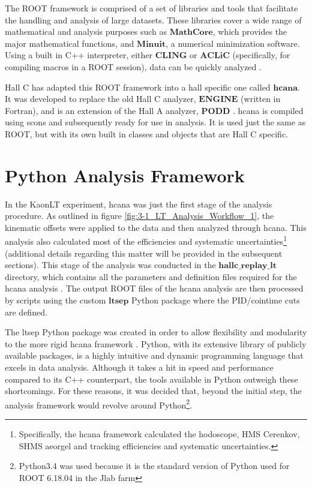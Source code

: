 \documentclass[
]{report}
\begin{document}
The ROOT framework is comprised of a set of libraries and tools that
facilitate the handling and analysis of large datasets. These libraries
cover a wide range of mathematical and analysis purposes such as
\(\textbf{MathCore}\), which provides the major mathematical functions,
and \(\textbf{Minuit}\), a numerical minimization software. Using a
built in C++ interpreter, either \(\textbf{CLING}\) or
\(\textbf{ACLiC}\) (specifically, for compiling macros in a ROOT
session), data can be quickly analyzed \cite{root_team_root_2023}.

Hall C has adapted this ROOT framework into a hall specific one called
\(\textbf{hcana}\). It was developed to replace the old Hall C analyzer,
\(\textbf{ENGINE}\) (written in Fortran), and is an extension of the
Hall A analyzer, \(\textbf{PODD}\) \cite{jones_hall_2022}
\cite{brash_github_2014}. hcana is compiled using scons and subsequently
ready for use in analysis. It is used just the same as ROOT, but with
its own built in classes and objects that are Hall C specific.

\hypertarget{Section-5.1}{%
\section{Python Analysis Framework}\label{Section-5.1}}

In the KaonLT experiment, hcana was just the first stage of the analysis
procedure. As outlined in figure \ref{fig:3-1_LT_Analysis_Workflow_1},
the kinematic offsets were applied to the data and then analyzed through
hcana. This analysis also calculated most of the efficiencies and
systematic
uncertainties\footnote{Specifically, the hcana framework calculated the hodoscope, HMS Cerenkov, SHMS aeorgel and tracking efficiencies and systematic uncertainties.}
(additional details regarding this matter will be provided in the
subsequent sections). This stage of the analysis was conducted in the
\(\textbf{hallc\_replay\_lt}\) directory, which contains all the
parameters and definition files required for the hcana analysis
\cite{kay_github_2018-1}. The output ROOT files of the hcana analysis
are then processed by scripts using the custom \(\textbf{ltsep}\) Python
package where the PID/cointime cuts are defined.



The ltsep Python package was created in order to allow flexibility and
modularity to the more rigid hcana framework \cite{trotta_github_2020}.
Python, with its extensive library of publicly available packages, is a
highly intuitive and dynamic programming language that excels in data
analysis. Although it takes a hit in speed and performance compared to
its C++ counterpart, the tools available in Python outweigh these
shortcomings. For these reasons, it was decided that, beyond the initial
step, the analysis framework would revolve around
Python\footnote{Python3.4 was used because it is the standard version of Python used for ROOT 6.18.04 in the Jlab farm}.
\end{document}
